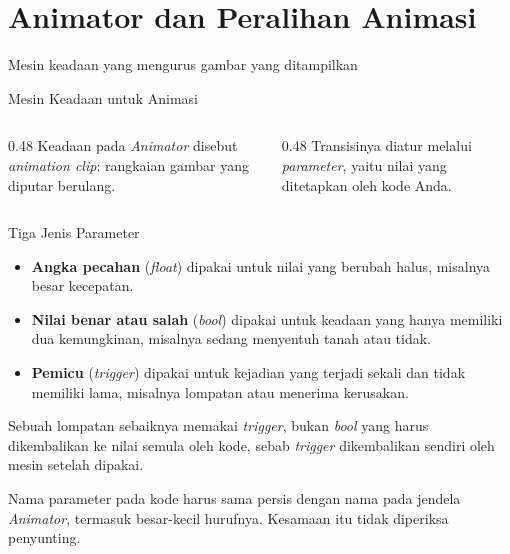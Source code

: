 \documentclass[aspectratio=169,10pt]{beamer}
\begin{document}
\section{Animator dan Peralihan Animasi}
  {Mesin keadaan yang mengurus gambar yang ditampilkan}

\begin{frame}{Mesin Keadaan untuk Animasi}
\centering
{}
\vspace{0.10cm}
\begin{columns}[T,onlytextwidth]
  \begin{column}{0.48\textwidth}
    {\scriptsize Keadaan pada \emph{Animator} disebut \emph{animation clip}:
     rangkaian gambar yang diputar berulang.}
  \end{column}
  \begin{column}{0.48\textwidth}
    {\scriptsize Transisinya diatur melalui \emph{parameter}, yaitu nilai
     yang ditetapkan oleh kode Anda.}
  \end{column}
\end{columns}
\end{frame}

\begin{frame}{Tiga Jenis Parameter}
\begin{itemize}
  \item \textbf{Angka pecahan} (\emph{float}) dipakai untuk nilai yang berubah
        halus, misalnya besar kecepatan.
  \item \textbf{Nilai benar atau salah} (\emph{bool}) dipakai untuk keadaan
        yang hanya memiliki dua kemungkinan, misalnya sedang menyentuh tanah
        atau tidak.
  \item \textbf{Pemicu} (\emph{trigger}) dipakai untuk kejadian yang terjadi
        sekali dan tidak memiliki lama, misalnya lompatan atau menerima
        kerusakan.
\end{itemize}
\vspace{0.12cm}
\begin{peringatan}
Sebuah lompatan sebaiknya memakai \emph{trigger}, bukan \emph{bool} yang harus
dikembalikan ke nilai semula oleh kode, sebab \emph{trigger} dikembalikan
sendiri oleh mesin setelah dipakai.
\end{peringatan}
\begin{kotak}
Nama parameter pada kode harus sama persis dengan nama pada jendela
\emph{Animator}, termasuk besar-kecil hurufnya. Kesamaan itu tidak diperiksa
penyunting.
\end{kotak}
\end{frame}
\end{document}
